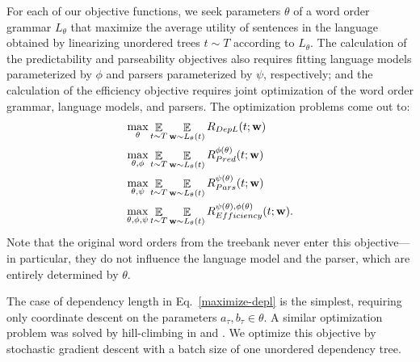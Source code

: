 \documentclass[12pt]{article}
\DeclareMathOperator{\E}{\mathop{\mathbb{E}}}
\begin{document}
For each of our objective functions, we seek parameters $\theta$ of a word order grammar $L_\theta$ that maximize the average utility of sentences in the language obtained by linearizing unordered trees $t \sim T$ according to $L_\theta$. The calculation of the predictability and parseability objectives also requires fitting language models parameterized by $\phi$ and parsers parameterized by $\psi$, respectively; and the calculation of the efficiency objective requires joint optimization of the word order grammar, language models, and parsers. The optimization problems come out to:
\begin{align}
\max_\theta &\E_{t \sim T}\E_{{\bf w} \sim L_\theta(t)} R_{DepL}(t; {\bf w}) \label{eq:maximize-depl}\\
\max_{\theta,\phi} &\E_{t \sim T}\E_{{\bf w} \sim L_\theta(t)} R_{Pred}^{\phi(\theta)}(t; {\bf w}) \label{eq:maximize-pred}\\
\max_{\theta,\psi} &\E_{t \sim T}\E_{{\bf w} \sim L_\theta(t)} R_{Pars}^{\psi(\theta)}(t; {\bf w}) \label{Eq:maximize-pars} \\
\max_{\theta,\phi,\psi} &\E_{t \sim T}\E_{{\bf w} \sim L_\theta(t)} R_{Efficiency}^{\psi(\theta), \phi(\theta)}(t; {\bf w}). \label{eq:maximize-efficiency} 
\end{align}
Note that the original word orders from the treebank never enter this objective---in particular, they do not influence the language model and the parser, which are entirely determined by $\theta$.

The case of dependency length in Eq.~\ref{maximize-depl} is the simplest, requiring only coordinate descent on the parameters $a_\tau, b_\tau \in \theta$. A similar optimization problem was solved by hill-climbing in \citet{gildea2007optimizing} and \citet{gildea2015human}.
We optimize this objective by stochastic gradient descent with a batch size of one unordered dependency tree.
\end{document}
